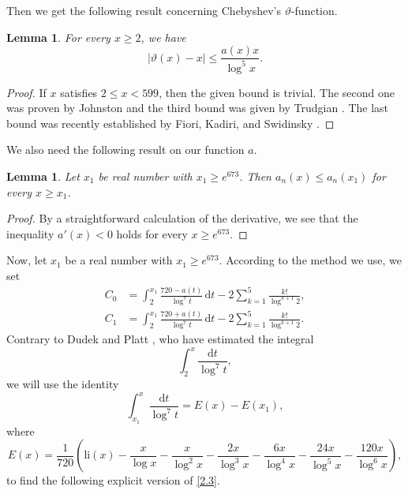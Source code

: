 \documentclass[a4paper,12pt]{amsart}
\newtheorem{lem}[thm]{Lemma}
\theoremstyle{definition}
\theoremstyle{remark}
\begin{document}
Then we get the following result concerning Chebyshev's $\vartheta$-function.

\begin{lem} \label{lem201}
For every $x \geq 2$, we have
\begin{displaymath}
|\vartheta(x) - x| \leq \frac{a(x)x}{\log^5x}.
\end{displaymath}
\end{lem}

\begin{proof}
If $x$ satisfies $2 \leq x < 599$, then the given bound is trivial. The second one was proven by Johnston \cite[Corollary 3.3]{johnston} and the third bound was given by Trudgian \cite[Theorem 1]{trud}. The last bound was recently established by Fiori, Kadiri, and Swidinsky \cite[Corollary 14]{kadiri}.
\end{proof}

We also need the following result on our function $a$.


\begin{lem} \label{lem202}
Let $x_1$ be real number with $x_1 \geq e^{673}$. Then $a_n(x) \leq a_n(x_1)$ for every $x \geq x_1$.
\end{lem}

\begin{proof}
By a straightforward calculation of the derivative, we see that the inequality $a'(x) < 0$ holds for every $x \geq e^{673}$.
\end{proof}

Now, let $x_1$ be a real number with $x_1 \geq e^{673}$. According to the method we use, we set
\begin{align*}
C_0 &= \int_2^{x_1} \frac{720 - a(t)}{\log^7 t} \, \text{d}t - 2\sum_{k=1}^5 \frac{k!}{\log^{k+1}2}, \\
C_1 &= \int_2^{x_1} \frac{720 + a(t)}{\log^7 t} \, \text{d}t - 2\sum_{k=1}^5 \frac{k!}{\log^{k+1}2}. 
\end{align*}
Contrary to Dudek and Platt \cite{dudekplatt}, who have estimated the integral
\begin{displaymath}
\int_2^x \frac{\text{d}t}{\log^7t},
\end{displaymath}
we will use the identity
\begin{equation}
\int_{x_1}^x \frac{\text{d}t}{\log^7t} = E(x) - E(x_1), \tag{2.4} \label{2.4}
\end{equation}
where
\begin{displaymath}
E(x) = \frac{1}{720} \left( \text{li}(x) - \frac{x}{\log x} - \frac{x}{\log^2x} - \frac{2x}{\log^3x} - \frac{6x}{\log^4x} - \frac{24x}{\log^5x} - \frac{120x}{\log^6x}\right),
\end{displaymath}
to find the following explicit version of \eqref{2.3}.
\end{document}
